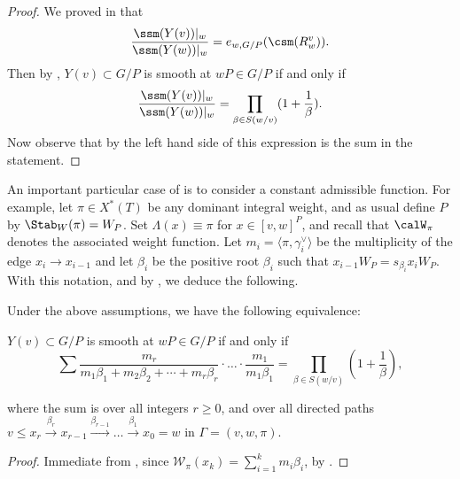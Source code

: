 \begin{proof} We proved in  that 
	\[ \frac{\ssm(Y(v))|_w}{\ssm(Y(w))|_w}=e_{w,G/P} (\csm(R_w^{v})) \/. \]
	Then by 
	, $Y(v)\subset G/P$ is smooth at $wP\in G/P$ if and only if 
	\[ \frac{\ssm(Y(v))|_w}{\ssm(Y(w))|_w} = \prod_{\beta\in S(w/v)}(1+\frac{1}{\beta}) \/. \]
	Now observe that by  the left hand side of this expression is the sum in the statement.\end{proof}
An important particular case of  is to consider a constant admissible function.
For example, let $\pi\in X^*(T)$ be any dominant integral weight, and as usual define 
$P$ by $\Stab_W(\pi)=W_P$. Set
$\Lambda(x) \equiv \pi$ for $x \in [v,w]^P$, and recall that $\calW_\pi$ denotes the associated
weight function. Let $m_i = \langle \pi, \gamma_i^\vee \rangle$ be the multiplicity of the 
edge $x_i \to x_{i-1}$ and let $\beta_i$ be the positive root
$\beta_i$ such that $x_{i-1}W_P = s_{\beta_i}x_i W_P$.
With this notation, and by , we deduce the following.
\begin{corol}\label{col:NakP}
	Under the above assumptions,
	we have the following equivalence:
	\begin{center}
		$Y(v)\subset G/P$ is smooth at $wP\in G/P$  if and only if
		\[
		\sum \frac{m_r}{m_1\beta_1+m_2\beta_2+\cdots +m_r\beta_r} \cdot \ldots \cdot 
		\frac{m_1}{m_1\beta_1}
		=\prod_{\beta \in S(w/v)}\left(1+\frac{1}{\beta}\right),
		\]
	\end{center}
	where the sum is over all integers $r \ge 0$, and over all directed paths 
	$v\leq x_r \overset{\beta_r}{\to} x_{r-1} \overset{\beta_{r-1}}{\to} \ldots \overset{\beta_1}{\to} x_0 = w$ in $\Gamma= (v,w,\pi)$. 
\end{corol}
\begin{proof} Immediate from , since $\mathcal{W}_\pi(x_k)=\sum_{i=1}^k m_i \beta_i$,
	by . 
\end{proof}


